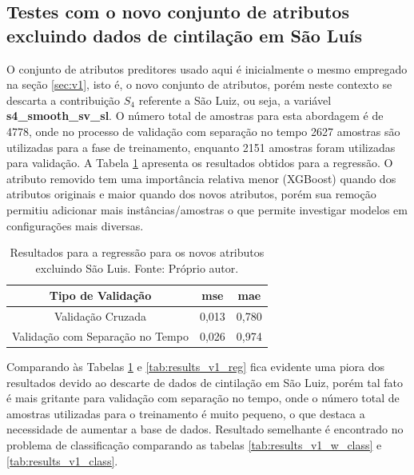
\subsection{Testes com o novo conjunto de atributos excluindo dados de cintilação em São Luís}

O conjunto de atributos preditores usado aqui é inicialmente o mesmo empregado na seção \ref{sec:v1}, isto é, o novo conjunto de atributos, porém neste contexto se descarta a contribuição $S_4$ referente a São Luiz, ou seja, a variável {\bf s4\_smooth\_sv\_sl}. O número total de amostras para esta abordagem é de 4778, onde no processo de validação com separação no tempo 2627 amostras são utilizadas para a fase de treinamento, enquanto 2151 amostras foram utilizadas para validação. A Tabela \ref{tab:results_v1_w_reg} apresenta os resultados obtidos para a regressão. O atributo removido tem uma importância relativa menor (XGBoost) quando dos atributos originais e maior quando dos novos atributos, porém sua remoção permitiu adicionar mais instâncias/amostras o que permite investigar modelos em configurações mais diversas.

\begin{table}[h]
\begin{center}
\begin{tabular}{|c|c|c|}
\hline
Tipo de Validação & mse       & mae   \\ \hline
Validação Cruzada                   & 0,013   & 0,780  \\ \hline
Validação com Separação no Tempo    & 0,026   & 0,974  \\ \hline
\end{tabular}
\end{center}
\vspace{12pt}
\caption{Resultados para a regressão para os novos atributos excluindo São Luis. Fonte: Próprio autor.}
\label{tab:results_v1_w_reg}
\end{table}

Comparando às Tabelas \ref{tab:results_v1_w_reg} e \ref{tab:results_v1_reg} fica evidente uma piora dos resultados devido ao descarte de dados de cintilação em São Luiz, porém tal fato é mais gritante para validação com separação no tempo, onde o número total de amostras utilizadas para o treinamento é muito pequeno, o que destaca a necessidade de aumentar a base de dados. Resultado semelhante é encontrado no problema de classificação comparando as tabelas \ref{tab:results_v1_w_class} e \ref{tab:results_v1_class}.

